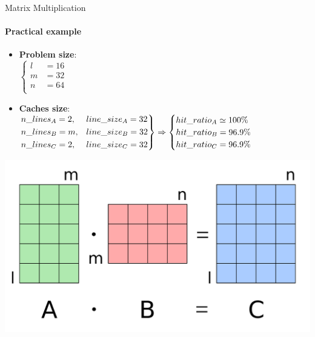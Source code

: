 \documentclass[handout,aspectratio=169]{beamer}
\begin{document}
\begin{frame}{Matrix Multiplication}
	\framesubtitle{Practical example}
	\begin{minipage}{.77\textwidth}
		\begin{itemize}
			\item \textbf{Problem size}:\\
				$\begin{cases}
					l &= 16 \\
					m &= 32 \\
					n &= 64 \\
				\end{cases}$
			\item \textbf{Caches size}:\\
				$\begin{rcases}
					n\_lines_A = 2, & line\_size_A = 32 \\
					n\_lines_B = m, & line\_size_B = 32 \\
					n\_lines_C = 2, & line\_size_C = 32 \\
				\end{rcases}
				\Rightarrow
				\begin{cases}
					hit\_ratio_A \simeq 100\% \\
					hit\_ratio_B = 96.9\% \\
					hit\_ratio_C = 96.9\% \\
				\end{cases}$
		\end{itemize}
	\end{minipage}
	\begin{minipage}{.22\textwidth}
		\begin{center}
			\includegraphics[width=.9\textwidth]{matmul.png}
		\end{center}
	\end{minipage}
\end{frame}
\end{document}
